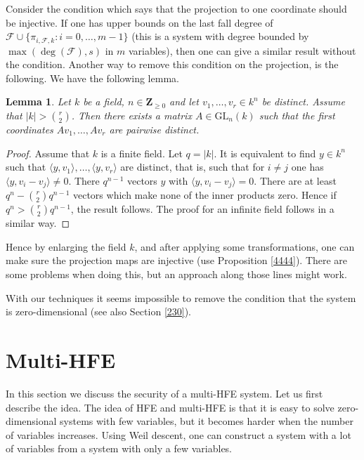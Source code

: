 \documentclass{amsart}
\theoremstyle{plain}
\newtheorem{lemma}[theorem]{Lemma}
\theoremstyle{definition}
\begin{document}
Consider the condition which says that the projection to one coordinate should be injective. If one has upper bounds on the last fall degree of $\mathcal{F} \cup \{\pi_{i,\mathcal{F},k}: i=0,\ldots,m-1\}$ (this is a system with degree bounded by $\max(\deg(\mathcal{F}),s)$ in $m$ variables), then one can give a similar result without the condition.
Another way to remove this condition on the projection, is the following.
We have the following lemma.
\begin{lemma} \label{446}
Let $k$ be a field, $n \in {\mathbf{Z}}_{\geq 0}$ and let $v_1,\ldots,v_r \in k^n$ be distinct. Assume that $|k| > {{r}\choose{2}}$. Then there exists a matrix $A \in \mathrm{GL}_n(k)$ such that the first coordinates $Av_1,\ldots,Av_r$ are pairwise distinct.  
\end{lemma}
\begin{proof}
Assume that $k$ is a finite field. Let $q=|k|$. It is equivalent to find $y \in k^n$ such that $\langle y, v_1 \rangle, \ldots, \langle y, v_r \rangle$ are distinct, that is, such that for $i \neq j$ one has $\langle y, v_i-v_j \rangle \neq 0$. There $q^{n-1}$ vectors $y$ with $\langle y, v_i-v_j \rangle =0$. There are at least $q^n-{{r}\choose{2}} q^{n-1}$ vectors which make none of the inner products zero. Hence if $q^n >  {{r}\choose{2}} q^{n-1}$, the result follows. The proof for an infinite field follows in a similar way.
\end{proof}
Hence by enlarging the field $k$, and after applying some transformations, one can make sure the projection maps are injective (use Proposition \ref{4444}). There are some problems when doing this, but an approach along those lines might work.

With our techniques it seems impossible to remove the condition that the system is zero-dimensional (see also Section \ref{230}).

\section{Multi-HFE} \label{304}

In this section we discuss the security of a multi-HFE system. Let us first describe the idea.
The idea of HFE and multi-HFE is that it is easy to solve zero-dimensional systems with few variables, but it becomes harder when the number of variables increases. Using Weil descent, one can construct a system with a lot of variables from a system with only a few variables.
\end{document}
